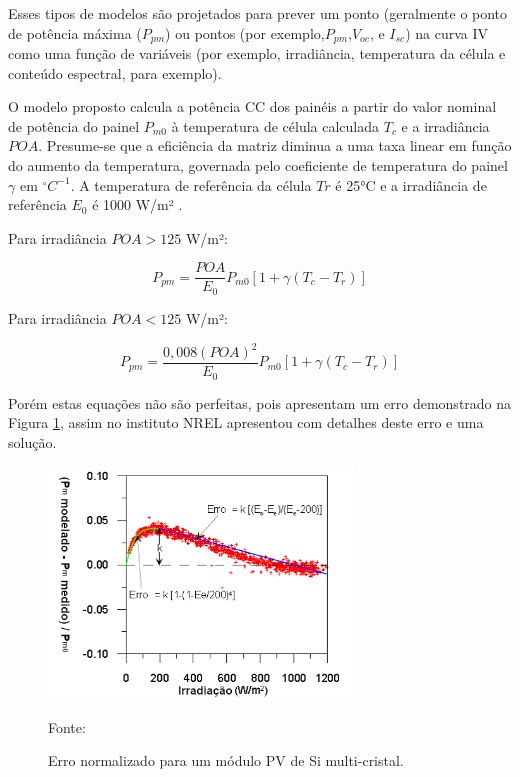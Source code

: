 Esses tipos de modelos são projetados para prever um ponto (geralmente o ponto de potência máxima ($P_{pm}$) ou pontos (por exemplo,$P_{pm}$,$V_{oc}$, e $I_{sc}$) na curva IV como uma função de variáveis  (por exemplo, irradiância, temperatura da célula e conteúdo espectral, para exemplo).

O modelo proposto calcula a potência CC dos painéis a partir do valor nominal de potência do painel $P_{m0}$ à temperatura de célula calculada $T_c$ e a irradiância $POA$. Presume-se que a eficiência da matriz diminua a uma taxa linear em função do aumento da temperatura, governada pelo coeficiente de temperatura do painel $\gamma$ em $^{\circ} C^{-1}$. A temperatura de referência da célula $Tr$ é 25°C e a irradiância de referência $E_0$ é 1000 W/m² \cite{PVWatts}.
\newline

Para irradiância $POA > 125$ W/m²:

\begin{equation}
    P_{pm} = \frac{POA}{E_0} P_{m0} [1 + \gamma(T_c - T_r)]
    \label{eq:pmp}
\end{equation}

Para irradiância $POA < 125$ W/m²:

\begin{equation}
    P_{pm} = \frac{0,008 (POA)^2}{E_0} P_{m0} [1 + \gamma(T_c - T_r)]
    \label{eq:pmp2}
\end{equation}

Porém estas equações não são perfeitas, pois apresentam um erro demonstrado na Figura \ref{fig:PVWatts_erro}, assim \cite{Marion} no instituto NREL apresentou com detalhes deste erro e uma solução.

\begin{figure}[H]
    \centering
    \includegraphics[width=0.725\textwidth]{./Figuras/PVWatts_erro.png}
    \caption{Erro normalizado para um módulo PV de Si multi-cristal.}{Fonte: \cite{Marion}}
   \label{fig:PVWatts_erro}
\end{figure}

